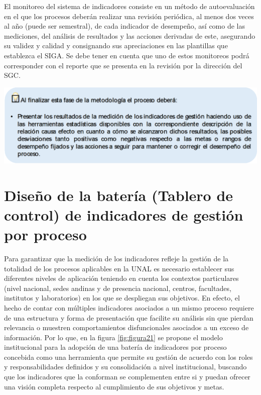 \documentclass[
]{book}
\begin{document}
El monitoreo del sistema de indicadores consiste en un método de autoevaluación en el que los procesos deberán realizar una revisión periódica, al menos dos veces al año (puede ser semestral), de cada indicador de desempeño, así como de las mediciones, del análisis de resultados y las acciones derivadas de este, asegurando su validez y calidad y consignando sus apreciaciones en las plantillas que establezca el SIGA. Se debe tener en cuenta que uno de estos monitoreos podrá corresponder con el reporte que se presenta en la revisión por la dirección del SGC.

\begin{center}\includegraphics[width=1\linewidth]{Imagenes/texto_9} \end{center}

\hypertarget{diseuxf1o-de-la-bateruxeda-tablero-de-control-de-indicadores-de-gestiuxf3n-por-proceso}{%
\chapter{Diseño de la batería (Tablero de control) de indicadores de gestión por proceso}\label{diseuxf1o-de-la-bateruxeda-tablero-de-control-de-indicadores-de-gestiuxf3n-por-proceso}}

Para garantizar que la medición de los indicadores refleje la gestión de la totalidad de los procesos aplicables en la UNAL es necesario establecer sus diferentes niveles de aplicación teniendo en cuenta los contextos particulares (nivel nacional, sedes andinas y de presencia nacional, centros, facultades, institutos y laboratorios) en los que se despliegan sus objetivos. En efecto, el hecho de contar con múltiples indicadores asociados a un mismo proceso requiere de una estructura y forma de presentación que facilite su análisis sin que pierdan relevancia o muestren comportamientos disfuncionales asociados a un exceso de información. Por lo que, en la figura \ref{fig:figura21} se propone el modelo institucional para la adopción de una batería de indicadores por proceso concebida como una herramienta que permite su gestión de acuerdo con los roles y responsabilidades definidos y su consolidación a nivel institucional, buscando que los indicadores que la conforman se complementen entre si y puedan ofrecer una visión completa respecto al cumplimiento de sus objetivos y metas.
\end{document}
